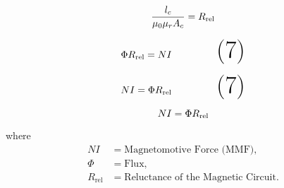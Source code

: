 \documentclass{article}
\begin{document}
\begin{tcolorbox}[colframe=black, boxrule=1mm, sharp corners=south] %
\[
   \Huge \frac{l_c}{\mu_0 \mu_r A_c} = R_\text{rel}
\]
\end{tcolorbox}

\vspace{0.5cm} %
\begin{equation}
   \Huge  {\Phi}R_\text{rel}= NI \tag{7}
\end{equation}\vspace{0.5cm} %

\vspace{0.5cm} %
\begin{equation}
   \Huge NI  = {\Phi}R_\text{rel}\tag{7}
\end{equation}\vspace{0.5cm} %

\begin{tcolorbox}[colframe=red, boxrule=1mm, sharp corners=south] %
\[
   \Huge NI= {\Phi}R_\text{rel}
\]
\end{tcolorbox}

\noindent
where 
\begin{align*}
NI &= \text{Magnetomotive Force (MMF)}, \\
\Phi &= \text{Flux}, \\
R_\text{rel} &= \text{Reluctance of the Magnetic Circuit}.
\end{align*}
\end{document}

